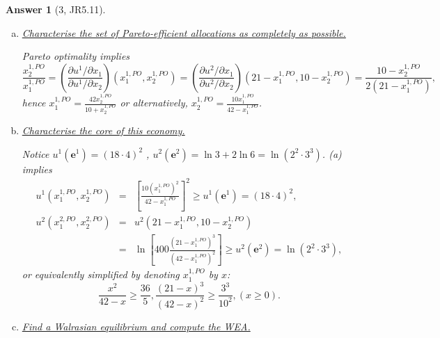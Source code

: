 \documentclass{article}
\newtheorem*{ans}{Answer}
\newcommand{\1}{{\bf 1}}
\newcommand{\0}{{\mathbf{0}}}
\newcommand{\e}{{\mathbf{e}}}
\newcommand{\<}{\langle}
\renewcommand{\>}{\rangle}
\begin{document}
\begin{ans}[3, JR5.11]
	\begin{enumerate}[(a)]
		\item  \ul{Characterise the set of Pareto-efficient allocations as completely as possible.}
		
		Pareto optimality implies 
		$$ \frac{x_2^{1,PO}}{x_1^{1,PO}}= \left(\frac{ \partial u^1 / \partial x_1}{ \partial u^1 / \partial x_2}\right)\left(x_1^{1,PO} ,x_2^{1,PO} \right) = \left(\frac{ \partial u^2 / \partial x_1}{ \partial u^2 / \partial x_2}\right) \left( 21  - x_1^{1,PO}, 10 - x_2^{1,PO} \right) = \frac{10 - x_2^{1,PO} }{2\left(21 - x_1^{1,PO}\right)} ,$$
		hence $x_1^{1,PO} = \frac{42 x_2^{1,PO} }{10 + x_2^{1,PO} }$ or alternatively, $x_2^{1,PO} = \frac{10 x_1^{1,PO} }{42 - x_1^{1,PO} }$.
		\item  \ul{Characterise the core of this economy.}
		
Notice $u^1\left(\e^1\right) = (18\cdot 4)^2  $ , $u^2\left(\e^2 \right) = \ln 3 +  2 \ln 6 =  \ln \left(2^2 \cdot 3^3\right)$. (a) implies 
\begin{eqnarray*}
	u^1 \left( x_1^{1,PO}, x_2^{1,PO} \right) &= &\left[ \frac{10 \left(x_1^{1,PO} \right)^2 }{42 - x_1^{1,PO} }\right]^2 \ge u^1\left( \e^1 \right)  = (18\cdot 4)^2, \\
	 u^2 \left( x_1^{2,PO}, x_2^{2,PO} \right) & = & 	 u^2 \left( 21 - x_1^{1,PO},  10  -x_2^{1,PO} \right)\\
	 &= & \ln \left[ 400 \frac{\left( 21 - x_1^{1,PO} \right)^3}{ \left( 42 -  x_1^{1,PO}\right)^2 }\right] \ge u^2\left( \e^2 \right) = \ln \left(2^2 \cdot 3^3\right),
\end{eqnarray*}
or equivalently simplified by denoting $x_1^{1,PO}$ by $x$: \begin{equation}
\frac{x^2}{ 42 -  x } \ge \frac{36}5, \frac{(21 - x)^3}{ (42 - x )^2}  \ge\frac{3^3}{10^2}, (x\ge 0).
	\label{eq:Q2 chara of core}
\end{equation} 
		\item \ul{Find a Walrasian equilibrium and compute the WEA.}
		

\end{enumerate}
\end{ans}
\end{document}
